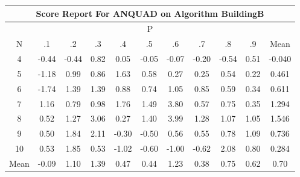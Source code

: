 \documentclass[11pt,a4paper]{report}
\begin{document}
\begin{longtable}{ | c || c | c | c | c | c | c | c | c | c || c |}
\hline
\multicolumn{11}{|c|}{ Score Report For ANQUAD on Algorithm BuildingB} \\
\hline
\multicolumn{11}{|c|}{ P } \\
\hline
N & .1 & .2 & .3 & .4 & .5 & .6 & .7 & .8 & .9 & Mean\\
 \hline
 \hline
 \endhead
  4 &  \cellcolor[HTML]{FFF7F7} -0.44 &  \cellcolor[HTML]{FFF7F7} -0.44 &  \cellcolor[HTML]{E7E7FF} 0.82 &  \cellcolor[HTML]{FFFFFF} 0.05 &  \cellcolor[HTML]{FFFFFF} -0.05 &  \cellcolor[HTML]{FFFFFF} -0.07 &  \cellcolor[HTML]{FFF7F7} -0.20 &  \cellcolor[HTML]{FFEFEF} -0.54 &  \cellcolor[HTML]{EFEFFF} 0.51 & -0.040 \\
  5 &  \cellcolor[HTML]{FFDFDF} -1.18 &  \cellcolor[HTML]{E7E7FF} 0.99 &  \cellcolor[HTML]{E7E7FF} 0.86 &  \cellcolor[HTML]{D7D7FF} 1.63 &  \cellcolor[HTML]{EFEFFF} 0.58 &  \cellcolor[HTML]{F7F7FF} 0.27 &  \cellcolor[HTML]{F7F7FF} 0.25 &  \cellcolor[HTML]{EFEFFF} 0.54 &  \cellcolor[HTML]{F7F7FF} 0.22 & 0.461 \\
  6 &  \cellcolor[HTML]{FFD7D7} -1.74 &  \cellcolor[HTML]{DFDFFF} 1.39 &  \cellcolor[HTML]{DFDFFF} 1.39 &  \cellcolor[HTML]{E7E7FF} 0.88 &  \cellcolor[HTML]{EFEFFF} 0.74 &  \cellcolor[HTML]{E7E7FF} 1.05 &  \cellcolor[HTML]{E7E7FF} 0.85 &  \cellcolor[HTML]{EFEFFF} 0.59 &  \cellcolor[HTML]{F7F7FF} 0.34 & 0.611 \\
  7 &  \cellcolor[HTML]{DFDFFF} 1.16 &  \cellcolor[HTML]{EFEFFF} 0.79 &  \cellcolor[HTML]{E7E7FF} 0.98 &  \cellcolor[HTML]{CFCFFF} 1.76 &  \cellcolor[HTML]{D7D7FF} 1.49 &  \cellcolor[HTML]{9F9FFF} 3.80 &  \cellcolor[HTML]{EFEFFF} 0.57 &  \cellcolor[HTML]{EFEFFF} 0.75 &  \cellcolor[HTML]{F7F7FF} 0.35 & 1.294 \\
  8 &  \cellcolor[HTML]{EFEFFF} 0.52 &  \cellcolor[HTML]{DFDFFF} 1.27 &  \cellcolor[HTML]{AFAFFF} 3.06 &  \cellcolor[HTML]{F7F7FF} 0.27 &  \cellcolor[HTML]{DFDFFF} 1.40 &  \cellcolor[HTML]{9797FF} 3.99 &  \cellcolor[HTML]{DFDFFF} 1.28 &  \cellcolor[HTML]{E7E7FF} 1.07 &  \cellcolor[HTML]{E7E7FF} 1.05 & 1.546 \\
  9 &  \cellcolor[HTML]{EFEFFF} 0.50 &  \cellcolor[HTML]{CFCFFF} 1.84 &  \cellcolor[HTML]{C7C7FF} 2.11 &  \cellcolor[HTML]{FFF7F7} -0.30 &  \cellcolor[HTML]{FFEFEF} -0.50 &  \cellcolor[HTML]{EFEFFF} 0.56 &  \cellcolor[HTML]{EFEFFF} 0.55 &  \cellcolor[HTML]{EFEFFF} 0.78 &  \cellcolor[HTML]{E7E7FF} 1.09 & 0.736 \\
  10 &  \cellcolor[HTML]{EFEFFF} 0.53 &  \cellcolor[HTML]{CFCFFF} 1.85 &  \cellcolor[HTML]{EFEFFF} 0.53 &  \cellcolor[HTML]{FFE7E7} -1.02 &  \cellcolor[HTML]{FFEFEF} -0.60 &  \cellcolor[HTML]{FFE7E7} -1.00 &  \cellcolor[HTML]{FFEFEF} -0.62 &  \cellcolor[HTML]{C7C7FF} 2.08 &  \cellcolor[HTML]{E7E7FF} 0.80 & 0.284 \\
 \hline
 \hline
Mean &  \cellcolor[HTML]{FFFFFF} -0.09 &  \cellcolor[HTML]{E7E7FF} 1.10 &  \cellcolor[HTML]{DFDFFF} 1.39 &  \cellcolor[HTML]{F7F7FF} 0.47 &  \cellcolor[HTML]{F7F7FF} 0.44 &  \cellcolor[HTML]{DFDFFF} 1.23 &  \cellcolor[HTML]{F7F7FF} 0.38 &  \cellcolor[HTML]{EFEFFF} 0.75 &  \cellcolor[HTML]{EFEFFF} 0.62 &  \cellcolor[HTML]{EFEFFF} 0.70
\end{longtable}
\end{document}
